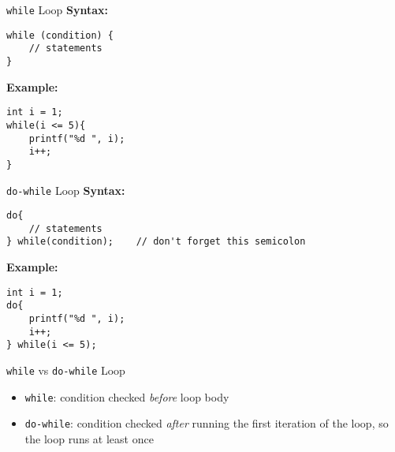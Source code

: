 \documentclass[12pt, aspectratio=169]{beamer}
\begin{document}
    \begin{frame}[fragile]{\texttt{while} Loop}
        \textbf{Syntax:}
        \begin{verbatim}
while (condition) {
    // statements
}
        \end{verbatim}

        \textbf{Example:}
        \begin{verbatim}
int i = 1;
while(i <= 5){
    printf("%d ", i);
    i++;
}
        \end{verbatim}
    \end{frame}


    \begin{frame}[fragile]{\texttt{do-while} Loop}
        \textbf{Syntax:}
        \begin{verbatim}
do{
    // statements
} while(condition);    // don't forget this semicolon
        \end{verbatim}

        \textbf{Example:}
        \begin{verbatim}
int i = 1;
do{
    printf("%d ", i);
    i++;
} while(i <= 5);
        \end{verbatim}
    \end{frame}


    \begin{frame}{\texttt{while} vs \texttt{do-while} Loop}
        \begin{itemize}
            \item \texttt{while}: condition checked \textit{before} loop body
            \item \texttt{do-while}: condition checked \textit{after} running the first iteration of the loop, so the loop runs at least once
        \end{itemize}
    \end{frame}
\end{document}

